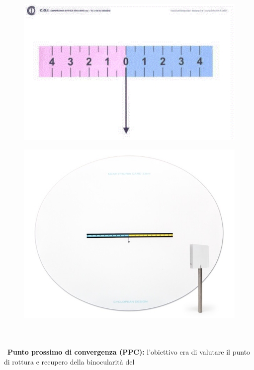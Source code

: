 \begin{figure}[h!]
\centering
\begin{minipage}{.5\textwidth}
  \centering
  \includegraphics[scale=0.15]{source/immagini/foria_lontano.png}
  \label{fig:test1}
\end{minipage}%
\begin{minipage}{.5\textwidth}
  \centering
  \includegraphics[scale=0.41]{source/immagini/foria_vicino.jpg}
  \label{fig:test2}
\end{minipage}
\end{figure}
\\\ \\\
\textbf{Punto prossimo di convergenza (PPC):} l’obiettivo era di valutare il punto di rottura e recupero della binocularità del
